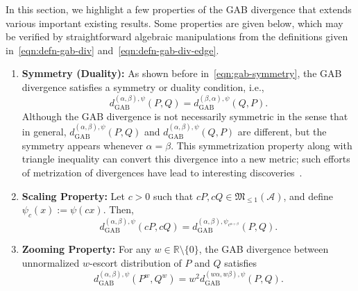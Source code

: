 \documentclass[11pt]{article}
\theoremstyle{plain}
\theoremstyle{remark}
\def\R{\mathbb{R}}
\newcommand{\Acal}{\mathcal{A}}
\newcommand{\Mfrak}{\mathfrak{M}}
\newcommand{\dGAB}{d_{\mathrm{GAB}}}
\begin{document}
In this section, we highlight a few properties of the GAB divergence that extends various important existing results. Some properties are given below, which may be verified by straightforward algebraic manipulations from the definitions given in~\eqref{eqn:defn-gab-div} and~\eqref{eqn:defn-gab-div-edge}.
\begin{enumerate}
    \item \textbf{Symmetry (Duality):} As shown before in~\eqref{eqn:gab-symmetry}, the GAB divergence satisfies a symmetry or duality condition, i.e.,
          \begin{equation}
              \dGAB^{(\alpha,\beta),\psi}(P, Q) = \dGAB^{(\beta, \alpha),\psi}(Q, P).
              \label{eqn:gab-symmetry}
          \end{equation}
          Although the GAB divergence is not necessarily symmetric in the sense that in general, $\dGAB^{(\alpha,\beta),\psi}(P, Q)$ and $\dGAB^{(\alpha,\beta),\psi}(Q, P)$ are different, but the symmetry appears whenever $\alpha = \beta$. This symmetrization property along with triangle inequality can convert this divergence into a new metric; such efforts of metrization of divergences have lead to interesting discoveries~\citep{vajda2009metric, okamura2025metrization}.

    \item \textbf{Scaling Property:} Let $c > 0$ such that $cP, cQ \in \Mfrak_{\leq 1}(\Acal)$, and define $\psi_c(x) := \psi(cx)$. Then,
          \begin{equation*}
              \dGAB^{(\alpha,\beta),\psi}(cP, cQ) = \dGAB^{(\alpha,\beta),\psi_{c^{\alpha+\beta}}}(P, Q).
          \end{equation*}
    \item \textbf{Zooming Property:} For any $w \in \R \setminus \{0\}$, the GAB divergence between unnormalized $w$-escort distribution of $P$ and $Q$ satisfies
          \begin{equation}
              \dGAB^{(\alpha,\beta),\psi}(P^w, Q^w) = w^2 \dGAB^{(w\alpha,w\beta),\psi}(P, Q).
              \label{eqn:gab-zoom}
          \end{equation}
\end{enumerate}
\end{document}
